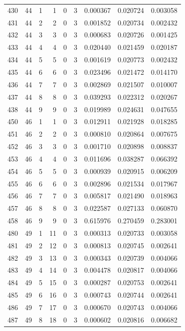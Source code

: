 \begin{longtable}{rrrrrrrrr}
430 & 44 & 1 & 1 & 0 & 3 & 0.000367 & 0.020724 & 0.003058 \\
431 & 44 & 2 & 2 & 0 & 3 & 0.001852 & 0.020734 & 0.002432 \\
432 & 44 & 3 & 3 & 0 & 3 & 0.000683 & 0.020726 & 0.001425 \\
433 & 44 & 4 & 4 & 0 & 3 & 0.020440 & 0.021459 & 0.020187 \\
434 & 44 & 5 & 5 & 0 & 3 & 0.001619 & 0.020773 & 0.002432 \\
435 & 44 & 6 & 6 & 0 & 3 & 0.023496 & 0.021472 & 0.014170 \\
436 & 44 & 7 & 7 & 0 & 3 & 0.002869 & 0.021507 & 0.010007 \\
437 & 44 & 8 & 8 & 0 & 3 & 0.039293 & 0.022312 & 0.020267 \\
438 & 44 & 9 & 9 & 0 & 3 & 0.019989 & 0.024631 & 0.047655 \\
450 & 46 & 1 & 1 & 0 & 3 & 0.012911 & 0.021928 & 0.018285 \\
451 & 46 & 2 & 2 & 0 & 3 & 0.000810 & 0.020864 & 0.007675 \\
452 & 46 & 3 & 3 & 0 & 3 & 0.001710 & 0.020898 & 0.008837 \\
453 & 46 & 4 & 4 & 0 & 3 & 0.011696 & 0.038287 & 0.066392 \\
454 & 46 & 5 & 5 & 0 & 3 & 0.000939 & 0.020915 & 0.006209 \\
455 & 46 & 6 & 6 & 0 & 3 & 0.002896 & 0.021534 & 0.017967 \\
456 & 46 & 7 & 7 & 0 & 3 & 0.005817 & 0.021490 & 0.018963 \\
457 & 46 & 8 & 8 & 0 & 3 & 0.022587 & 0.027133 & 0.060870 \\
458 & 46 & 9 & 9 & 0 & 3 & 0.615976 & 0.270459 & 0.283001 \\
480 & 49 & 1 & 11 & 0 & 3 & 0.000313 & 0.020733 & 0.003058 \\
481 & 49 & 2 & 12 & 0 & 3 & 0.000813 & 0.020745 & 0.002641 \\
482 & 49 & 3 & 13 & 0 & 3 & 0.000343 & 0.020739 & 0.004066 \\
483 & 49 & 4 & 14 & 0 & 3 & 0.004478 & 0.020817 & 0.004066 \\
484 & 49 & 5 & 15 & 0 & 3 & 0.000287 & 0.020753 & 0.002641 \\
485 & 49 & 6 & 16 & 0 & 3 & 0.000743 & 0.020744 & 0.002641 \\
486 & 49 & 7 & 17 & 0 & 3 & 0.000670 & 0.020743 & 0.004066 \\
487 & 49 & 8 & 18 & 0 & 3 & 0.000602 & 0.020816 & 0.006682 \\

\end{longtable}
